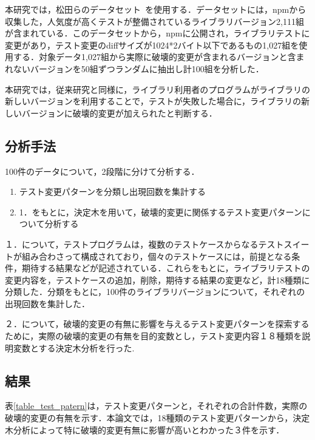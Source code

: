 \documentclass[uplatex,dvipdfmx,a4paper,twocolumn,base=11pt,jbase=11pt,ja=standard]{bxjsarticle}  %
\begin{document}
本研究では，松田らのデータセット~\cite{FOSE2021_Matsuda}を使用する．データセットには，npmから収集した，人気度が高くテストが整備されているライブラリバージョン2,111組が含まれている．このデータセットから，npmに公開され，ライブラリテストに変更があり，テスト変更のdiffサイズが1024*2バイト以下であるもの1,027組を使用する．対象データ1,027組から実際に破壊的変更が含まれるバージョンと含まれないバージョンを50組ずつランダムに抽出し計100組を分析した．

本研究では，従来研究と同様に，ライブラリ利用者のプログラムがライブラリの新しいバージョンを利用することで，テストが失敗した場合に，ライブラリの新しいバージョンに破壊的変更が加えられたと判断する．

\subsection{分析手法}

100件のデータについて，2段階に分けて分析する．
\vspace{-2mm}
\begin{enumerate}
 \item テスト変更パターンを分類し出現回数を集計する
 \item 1．をもとに，決定木を用いて，破壊的変更に関係するテスト変更パターンについて分析する
\end{enumerate}

１．について，テストプログラムは，複数のテストケースからなるテストスイートが組み合わさって構成されており，個々のテストケースには，前提となる条件，期待する結果などが記述されている．これらをもとに，ライブラリテストの変更内容を，テストケースの追加，削除，期待する結果の変更など，計18種類に分類した．分類をもとに，100件のライブラリバージョンについて，それぞれの出現回数を集計した．

２．について，破壊的変更の有無に影響を与えるテスト変更パターンを探索するために，実際の破壊的変更の有無を目的変数とし，テスト変更内容１８種類を説明変数とする決定木分析を行った.

\subsection{結果}

表\ref{table_test_patern}は，テスト変更パターンと，それぞれの合計件数，実際の破壊的変更の有無を示す．本論文では，18種類のテスト変更パターンから，決定木分析によって特に破壊的変更有無に影響が高いとわかった３件を示す．
\end{document}
